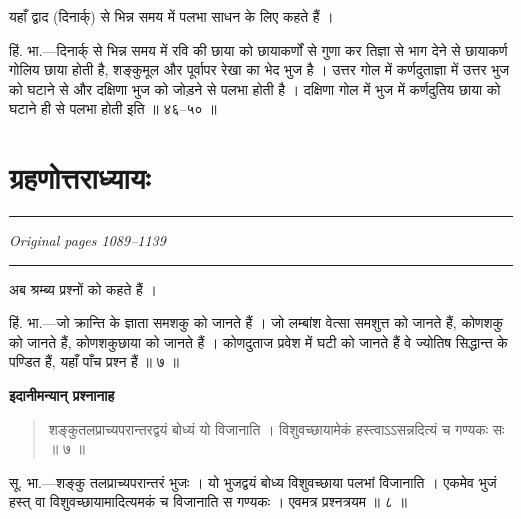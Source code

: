 \documentclass[11pt,a4paper]{article}
\newcommand{\dev}[1]{{\devanagarifont #1}}
\newenvironment{shloka}{\begin{quote}\devanagarifont}{\end{quote}}
\newenvironment{hindicom}{\devanagarifont}{\par}
\begin{document}
\vspace{0.3cm}
\dev{यहाँ द्वाद (दिनार्क्) से भिन्न समय में पलभा साधन के लिए कहते हैं ।}

\dev{हिं. भा.---दिनार्क् से भिन्न समय में रवि की छाया को छायाकर्णों से गुणा कर}
\dev{तिज्ञा से भाग देने से छायाकर्ण गोलिय छाया होती है, शङ्कुमूल और पूर्वापर रेखा का}
\dev{भेद भुज है । उत्तर गोल में कर्णदुताज्ञा में उत्तर भुज को घटाने से और दक्षिणा भुज}
\dev{को जोड़ने से पलभा होती है । दक्षिणा गोल में भुज में कर्णदुतिय छाया को घटाने ही से}
\dev{पलभा होती इति ॥ ४६--५० ॥}

\newpage

\section*{\dev{ग्रहणोत्तराध्यायः}}

\noindent\rule{\textwidth}{0.6pt}
\begin{center}
\textit{Original pages 1089--1139}
\end{center}
\noindent\rule{\textwidth}{0.6pt}
\vspace{0.5cm}

\begin{hindicom}
\dev{अब श्रम्ब्य प्रश्नों को कहते हैं ।}

\dev{हिं. भा.---जो क्रान्ति के ज्ञाता समशकु को जानते हैं । जो लम्बांश वेत्सा समशुत्त}
\dev{को जानते हैं, कोणशकु को जानते हैं, कोणशकुछाया को जानते हैं । कोणदुताज प्रवेश में}
\dev{घटी को जानते हैं वे ज्योतिष सिद्धान्त के पण्डित हैं, यहाँ पाँच प्रश्न हैं ॥ ७ ॥}
\end{hindicom}

\vspace{0.5cm}
\noindent\textbf{\dev{इदानीमन्यान् प्रश्नानाह}}

\begin{shloka}
\dev{शङ्कुतलप्राच्यपरान्तरद्वयं बोध्यं यो विजानाति ।}
\dev{विशुवच्छायामेकं हस्त्वाऽऽसन्नदित्यं च गण्यकः सः ॥ ७ ॥}
\end{shloka}

\vspace{0.3cm}
\begin{hindicom}
\dev{सू. भा.---शङ्कु तलप्राच्यपरान्तरं भुजः । यो भुजद्वयं बोध्य विशुवच्छाया}
\dev{पलभां विजानाति । एकमेव भुजं हस्त् वा विशुवच्छायामादित्यमकं च विजानाति}
\dev{स गण्यकः । एवमत्र प्रश्नत्रयम ॥ ८ ॥}
\end{hindicom}
\end{document}
